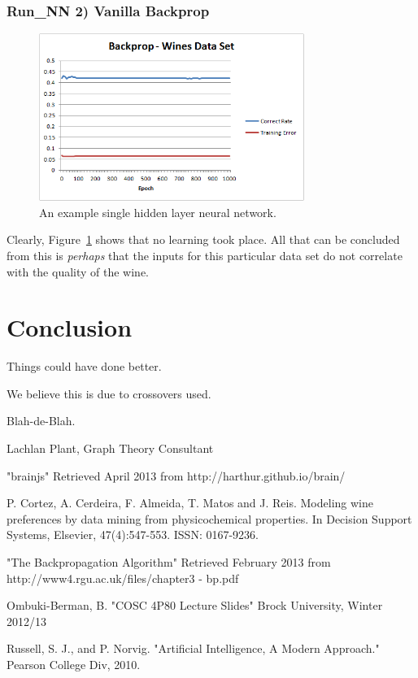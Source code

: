 \documentclass[journal]{IEEEtran}
\begin{document}
    \subsubsection{Run_{NN} 2) Vanilla Backprop}
      \begin{figure}[here]%
        \centering
        \includegraphics[width=3.4in]{brain_wine}
        \caption{An example single hidden layer neural network.}
        \label{fig:brain_wine}
      \end{figure}
    Clearly, Figure~\ref{fig:brain_wine} shows that no learning took place. All that can be concluded from this
    is \textit{perhaps} that the inputs for this particular data set do not correlate with the quality of the wine.

\section{Conclusion}
Things could have done better.

We believe this is due to crossovers used.

Blah-de-Blah.





\begin{thebibliography}{1}

Lachlan Plant, Graph Theory Consultant

"brainjs" Retrieved April 2013 from
http://harthur.github.io/brain/

  P. Cortez, A. Cerdeira, F. Almeida, T. Matos and J. Reis.
  Modeling wine preferences by data mining from physicochemical properties.
  In Decision Support Systems, Elsevier, 47(4):547-553. ISSN: 0167-9236.

"The Backpropagation Algorithm" Retrieved February 2013 from
http://www4.rgu.ac.uk/files/chapter3 - bp.pdf

Ombuki-Berman, B. "COSC 4P80 Lecture Slides" Brock University, Winter 2012/13

Russell, S. J., and P. Norvig. "Artificial Intelligence, A Modern Approach." Pearson College Div, 2010.

\end{thebibliography}


\end{document}
